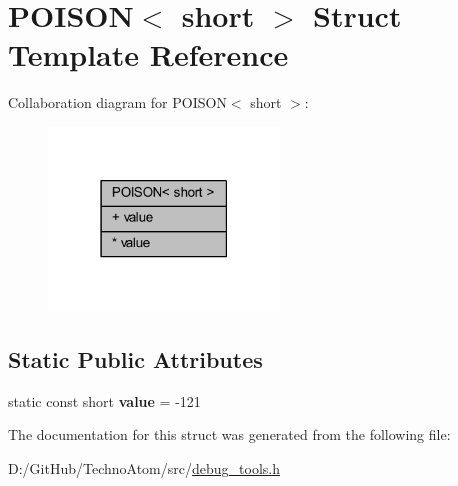 \hypertarget{struct_p_o_i_s_o_n_3_01short_01_4}{}\section{P\+O\+I\+S\+ON$<$ short $>$ Struct Template Reference}
\label{struct_p_o_i_s_o_n_3_01short_01_4}


Collaboration diagram for P\+O\+I\+S\+ON$<$ short $>$\+:
\nopagebreak
\begin{figure}[H]
\begin{center}
\leavevmode
\includegraphics[width=174pt]{struct_p_o_i_s_o_n_3_01short_01_4__coll__graph}
\end{center}
\end{figure}
\subsection*{Static Public Attributes}
\textbf{ }\par
\begin{DoxyCompactItemize}
\item 
\mbox{\label{struct_p_o_i_s_o_n_3_01short_01_4_a01dfef4676ecb3ae01b25c8e239d7d7f}} 
static const short {\bfseries value} = -\/121
\end{DoxyCompactItemize}



The documentation for this struct was generated from the following file\+:\begin{DoxyCompactItemize}
\item 
D\+:/\+Git\+Hub/\+Techno\+Atom/src/\hyperlink{debug__tools_8h}{debug\+\_\+tools.\+h}\end{DoxyCompactItemize}
